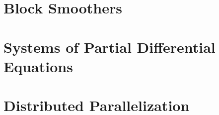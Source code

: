 \section{Block Smoothers}
\section{Systems of Partial Differential Equations}
\section{Distributed Parallelization}